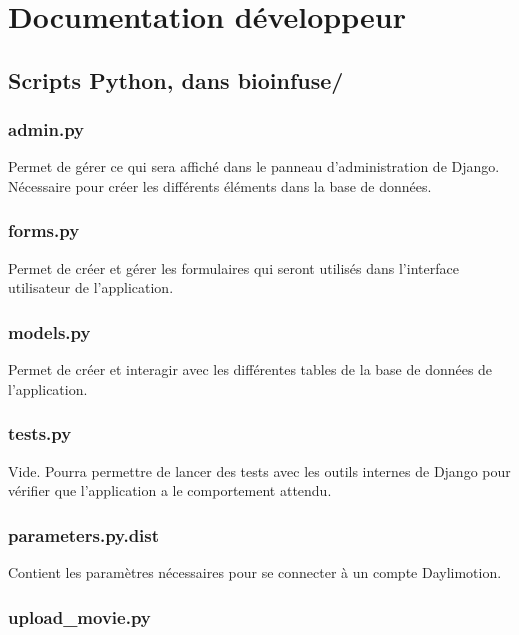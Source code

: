 \chapter{Documentation développeur}

\section{Scripts Python, dans bioinfuse/}

\subsection{admin.py}

Permet de gérer ce qui sera affiché dans le panneau d'administration de Django. Nécessaire pour créer les différents éléments dans la base de données.

\subsection{forms.py}

Permet de créer et gérer les formulaires qui seront utilisés dans l'interface utilisateur de l'application.

\subsection{models.py}

Permet de créer et interagir avec les différentes tables de la base de données de l'application.

\subsection{tests.py}

Vide. Pourra permettre de lancer des tests avec les outils internes de Django pour vérifier que l'application a le comportement attendu.

\subsection{parameters.py.dist}

Contient les paramètres nécessaires pour se connecter à un compte Daylimotion.

\subsection{upload_movie.py}

